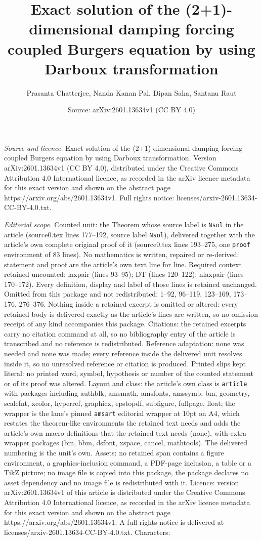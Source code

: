 \documentclass[10pt,a4paper]{amsart}
\title[Exact solution of the (2+1)-dimensional damping forcing coup]{Exact solution of the (2+1)-dimensional damping forcing coupled Burgers equation by using Darboux transformation}
\author{Prasanta Chatterjee, Nanda Kanan Pal, Dipan Saha, Santanu Raut}
\date{Source: arXiv:2601.13634v1 (CC BY 4.0)}
\begin{document}
\maketitle

\noindent\emph{Source and licence.} Exact solution of the (2+1)-dimensional damping forcing coupled Burgers equation by using Darboux transformation. Version arXiv:2601.13634v1 (CC BY 4.0), distributed under the Creative Commons Attribution 4.0 International licence, as recorded in the arXiv licence metadata for this exact version and shown on the abstract page https://arxiv.org/abs/2601.13634v1. Full rights notice: licenses/arxiv-2601.13634-CC-BY-4.0.txt.\par\smallskip

\noindent\textit{Editorial scope.} Counted unit: the Theorem whose source label is \texttt{Nsol} in the article (source0.tex lines 177--192, source label \texttt{Nsol}), delivered together with the article's own complete original proof of it (source0.tex lines 193--275, one \texttt{proof} environment of 83 lines). No mathematics is written, repaired or re-derived: statement and proof are the article's own text line for line. Required context retained uncounted: laxpair (lines 93--95); DT (lines 120--122); nlaxpair (lines 170--172). Every definition, display and label of those lines is retained unchanged. Omitted from this package and not redistributed: 1--92, 96--119, 123--169, 173--176, 276--376. Nothing inside a retained excerpt is omitted or altered: every retained body is delivered exactly as the article's lines are written, so no omission receipt of any kind accompanies this package. Citations: the retained excerpts carry no citation command at all, so no bibliography entry of the article is transcribed and no reference is redistributed. Reference adaptation: none was needed and none was made; every reference inside the delivered unit resolves inside it, so no unresolved reference or citation is produced. Printed slips kept literal: no printed word, symbol, hypothesis or number of the counted statement or of its proof was altered. Layout and class: the article's own class is \texttt{article} with packages including authblk, amsmath, amsfonts, amssymb, bm, geometry, scalefnt, xcolor, hyperref, graphicx, epstopdf, subfigure, fullpage, float; the wrapper is the lane's pinned \texttt{amsart} editorial wrapper at 10pt on A4, which restates the theorem-like environments the retained text needs and adds the article's own macro definitions that the retained text needs (none), with extra wrapper packages (bm, bbm, dsfont, xspace, cancel, mathtools). The delivered numbering is the unit's own. Assets: no retained span contains a figure environment, a graphics-inclusion command, a PDF-page inclusion, a table or a TikZ picture; no image file is copied into this package, the package declares no asset dependency and no image file is redistributed with it. Licence: version arXiv:2601.13634v1 of this article is distributed under the Creative Commons Attribution 4.0 International licence, as recorded in the arXiv licence metadata for this exact version and shown on the abstract page https://arxiv.org/abs/2601.13634v1. A full rights notice is delivered at licenses/arxiv-2601.13634-CC-BY-4.0.txt. Characters: 
\end{document}
